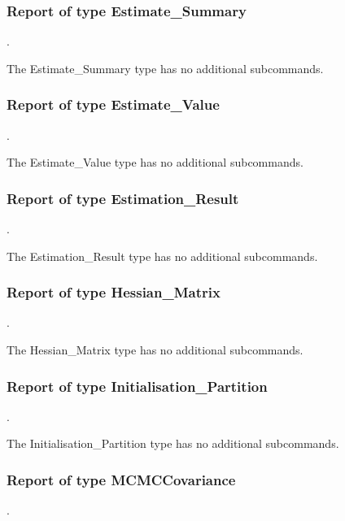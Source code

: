 
\subsubsection{Report of type Estimate\_Summary}
.
\label{syntax:Report-EstimateSummary}

The Estimate\_Summary type has no additional subcommands.
\subsubsection{Report of type Estimate\_Value}
.
\label{syntax:Report-EstimateValue}

The Estimate\_Value type has no additional subcommands.
\subsubsection{Report of type Estimation\_Result}
.
\label{syntax:Report-EstimationResult}

The Estimation\_Result type has no additional subcommands.
\subsubsection{Report of type Hessian\_Matrix}
.
\label{syntax:Report-HessianMatrix}

The Hessian\_Matrix type has no additional subcommands.
\subsubsection{Report of type Initialisation\_Partition}
.
\label{syntax:Report-InitialisationPartition}

The Initialisation\_Partition type has no additional subcommands.
\subsubsection{Report of type MCMCCovariance}
.
\label{syntax:Report-MCMCCovariance}

